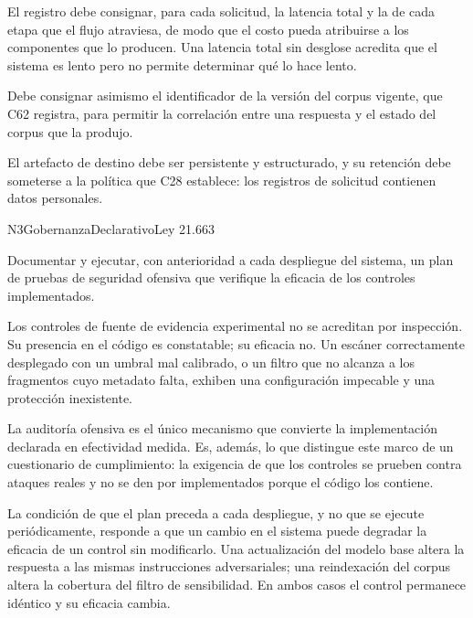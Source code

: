 El registro debe consignar, para cada solicitud, la latencia total y la de cada etapa que el flujo atraviesa, de modo que el costo pueda atribuirse a los componentes que lo producen. Una latencia total sin desglose acredita que el sistema es lento pero no permite determinar qué lo hace lento.

Debe consignar asimismo el identificador de la versión del corpus vigente, que C62 registra, para permitir la correlación entre una respuesta y el estado del corpus que la produjo.

El artefacto de destino debe ser persistente y estructurado, y su retención debe someterse a la política que C28 establece: los registros de solicitud contienen datos personales.


  {N3}{Gobernanza}{Declarativo}{Ley 21.663}

Documentar y ejecutar, con anterioridad a cada despliegue del sistema, un plan de pruebas de seguridad ofensiva que verifique la eficacia de los controles implementados.

Los controles de fuente de evidencia experimental no se acreditan por inspección. Su presencia en el código es constatable; su eficacia no. Un escáner correctamente desplegado con un umbral mal calibrado, o un filtro que no alcanza a los fragmentos cuyo metadato falta, exhiben una configuración impecable y una protección inexistente.

La auditoría ofensiva es el único mecanismo que convierte la implementación declarada en efectividad medida. Es, además, lo que distingue este marco de un cuestionario de cumplimiento: la exigencia de que los controles se prueben contra ataques reales y no se den por implementados porque el código los contiene.

La condición de que el plan preceda a cada despliegue, y no que se ejecute periódicamente, responde a que un cambio en el sistema puede degradar la eficacia de un control sin modificarlo. Una actualización del modelo base altera la respuesta a las mismas instrucciones adversariales; una reindexación del corpus altera la cobertura del filtro de sensibilidad. En ambos casos el control permanece idéntico y su eficacia cambia.

